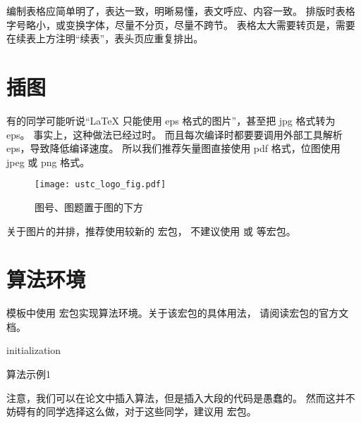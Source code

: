 编制表格应简单明了，表达一致，明晰易懂，表文呼应、内容一致。
排版时表格字号略小，或变换字体，尽量不分页，尽量不跨节。
表格太大需要转页是，需要在续表上方注明“续表”，表头页应重复排出。



\section{插图}

有的同学可能听说“\LaTeX{} 只能使用 eps 格式的图片”，甚至把 jpg 格式转为 eps。
事实上，这种做法已经过时。
而且每次编译时都要要调用外部工具解析 eps，导致降低编译速度。
所以我们推荐矢量图直接使用 pdf 格式，位图使用 jpeg 或 png 格式。
\begin{figure}[htb]
  \centering
  \texttt{[image: ustc\_logo\_fig.pdf]}
  \caption{图号、图题置于图的下方}
  \label{fig:logo}
\end{figure}

关于图片的并排，推荐使用较新的  宏包，
不建议使用  或  等宏包。



\section{算法环境}

模板中使用  宏包实现算法环境。关于该宏包的具体用法，
请阅读宏包的官方文档。

\begin{algorithm}[htb]
  \small
  \SetAlgoLined

  initialization\;
  \caption{算法示例1}
  \label{algo:algorithm1}
\end{algorithm}

注意，我们可以在论文中插入算法，但是插入大段的代码是愚蠢的。
然而这并不妨碍有的同学选择这么做，对于这些同学，建议用  宏包。

